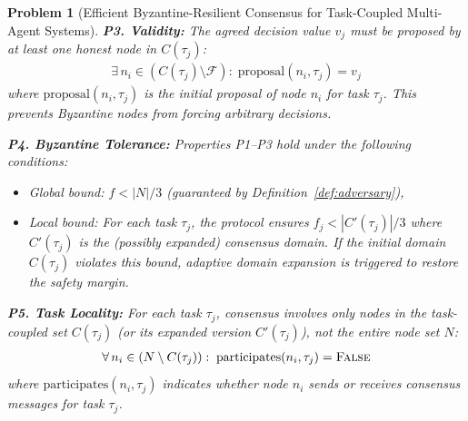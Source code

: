 \documentclass[manuscript,screen,review]{acmart}
\newtheorem{problem}{Problem}
\begin{document}
\begin{problem}[Efficient Byzantine-Resilient Consensus for Task-Coupled Multi-Agent Systems]
\vspace{0.3cm}
\noindent \textbf{P3. Validity:} The agreed decision value $v_j$ must be proposed by at least one honest node in $C(\tau_j)$:
\begin{equation}
\begin{aligned}
\exists\, n_i \in (C(\tau_j) \setminus \mathcal{F}):\;
\text{proposal}(n_i, \tau_j) = v_j
\label{eq:validity}
\end{aligned}
\end{equation}
where $\text{proposal}(n_i, \tau_j)$ is the initial proposal of node $n_i$ for task $\tau_j$. This prevents Byzantine nodes from forcing arbitrary decisions.

\vspace{0.3cm}
\noindent \textbf{P4. Byzantine Tolerance:} Properties P1--P3 hold under the following conditions:
\begin{itemize}
    \item \textit{Global bound}: $f < |N|/3$ (guaranteed by Definition~\ref{def:adversary}),
    \item \textit{Local bound}: For each task $\tau_j$, the protocol ensures $f_j < |C'(\tau_j)|/3$ where $C'(\tau_j)$ is the (possibly expanded) consensus domain. If the initial domain $C(\tau_j)$ violates this bound, adaptive domain expansion is triggered to restore the safety margin.
\end{itemize}

\vspace{0.3cm}
\noindent \textbf{P5. Task Locality:} For each task $\tau_j$, consensus involves only nodes in the task-coupled set $C(\tau_j)$ (or its expanded version $C'(\tau_j)$), not the entire node set $N$:
\begin{equation}
\begin{aligned}
\forall\, n_i \in (N \setminus C(\tau_j)):\;
\text{participates}(n_i, \tau_j) = \textsc{False}
\label{eq:locality}
\end{aligned}
\end{equation}
where $\text{participates}(n_i, \tau_j)$ indicates whether node $n_i$ sends or receives consensus messages for task $\tau_j$.


\end{problem}
\end{document}
